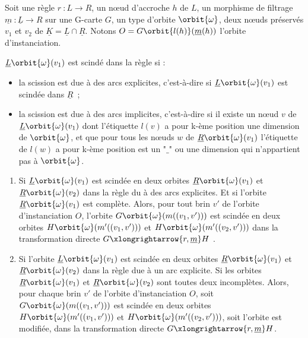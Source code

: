 \begin{proposition}\label{prop:formalisation-evenements-regles-jerboa-scission}
	Soit une règle $r~: L \longrightarrow R$, un nœud d'accroche $h$ de $L$, un morphisme de
	filtrage $\underline{m}~: \underline{L} \rightarrow R$ sur une G-carte $G$, un type d'orbite
	$\orbit{\omega}$, deux nœuds préservés $v_1$ et $v_2$ de $\underline{K} = \underline{L} \cap \underline{R}$. Notons $O = G\orbit{l(h)}(\underline{m}(h))$ l'orbite d'instanciation.

	$\underline{L}\orbit{\omega}(v_1)$ est scindé dans la règle si :
	\begin{itemize}
		\item la scission est due à des arcs explicites, c'est-à-dire si $\underline{L}\orbit{\omega}(v_1)$ est scindée dans $\underline{R}$~;

		\item la scission est due à des arcs implicites, c'est-à-dire si il existe un nœud $v$ de $\underline{L}\orbit{\omega}(v_1)$ dont l'étiquette $l(v)$ a pour k-ème position une dimension de $\orbit{\omega}$, et que pour tous les nœuds $w$ de $\underline{R}\orbit{\omega}(v_1)$ l'étiquette de $l(w)$ a pour k-ème position est un "$\_$" ou une dimension qui n'appartient pas à $\orbit{\omega}$.
	\end{itemize}

	\begin{enumerate}

		\item
		      Si $\underline{L}\orbit{\omega}(v_1)$ est scindée en deux orbites $\underline{R}\orbit{\omega}(v_1)$ et $\underline{R}\orbit{\omega}(v_2)$ dans la règle du à des arcs explicites.
		      Et si l'orbite $\underline{R}\orbit{\omega}(v_1)$ est complète. %
		      Alors, pour tout brin $v'$ de l'orbite d'instanciation $O$, l'orbite $G\orbit{\omega}(m((v_1,v')))$ est scindée en deux orbites $H\orbit{\omega}(m'((v_1, v')))$ et $H\orbit{\omega}(m'((v_2, v')))$ dans la transformation directe $G \xlongrightarrow{r,\underline{m}} H$ .

		\item Si l'orbite $\underline{L}\orbit{\omega}(v_1)$ est scindée en deux orbites $\underline{R}\orbit{\omega}(v_1)$ et
		      $\underline{R}\orbit{\omega}(v_2)$ dans la règle due à un arc explicite.
		      Si les orbites $\underline{R}\orbit{\omega}(v_1)$ et $\underline{R}\orbit{\omega}(v_2)$
		      sont toutes deux incomplètes.
		      Alors, pour chaque brin $v'$ de l'orbite d'instanciation $O$, soit $G\orbit{\omega}(m((v_1,v')))$ est scindée en deux orbites
		      $H\orbit{\omega}(m'((v_1, v')))$ et $H\orbit{\omega}(m'((v_2,v')))$, soit l'orbite est modifiée, dans la transformation directe
		      $G \xlongrightarrow{r, \underline{m}} H$.


\end{enumerate}
\end{proposition}
